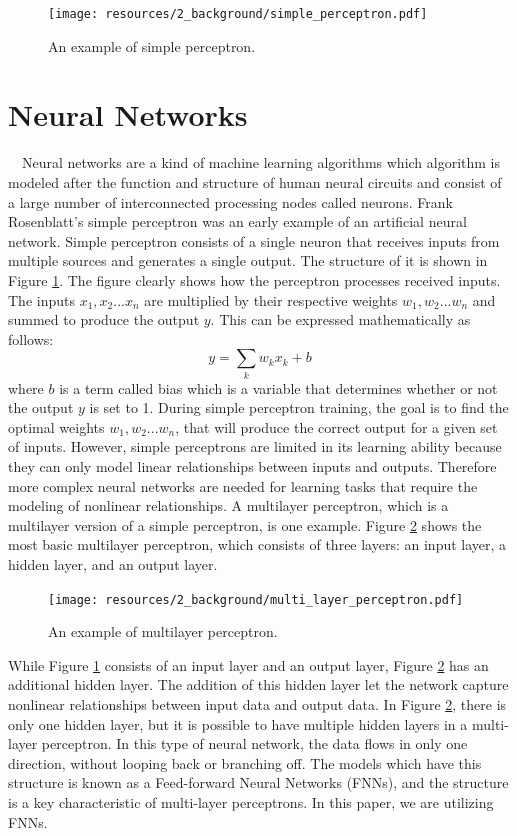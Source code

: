 \begin{figure}[h]
  \centering
  \texttt{[image: resources/2\_background/simple\_perceptron.pdf]}
  \caption{
    An example of simple perceptron.
  }
  \label{simple_perceptron}
\end{figure}

\section{Neural Networks}
　Neural networks are a kind of machine learning algorithms which 
algorithm is modeled after the function and structure of human 
neural circuits and consist of a large number of interconnected 
processing nodes called neurons.
Frank Rosenblatt's simple perceptron \cite{Rosenblatt1958ThePA} was 
an early example of an artificial neural network. 
Simple perceptron consists of a single neuron that receives inputs 
from multiple sources and generates a single output. 
The structure of it is shown in Figure \ref{simple_perceptron}. 
The figure clearly shows how the perceptron processes received inputs.
The inputs $x_1, x_2 ... x_n$ are multiplied by their respective weights
$w_1, w_2 ... w_n$ and summed to produce the output $y$.
This can be expressed mathematically as follows:
\begin{equation}
  \label{perceptron_output}
  y = \sum_{k}w_k x_k + b
\end{equation}
where $b$ is a term called bias which is a variable that determines 
whether or not the output $y$ is set to 1.
During simple perceptron training, the goal is to find the optimal 
weights $w_1, w_2 ... w_n$, that will produce the correct output for 
a given set of inputs.
However, simple perceptrons are limited in its learning ability because 
they can only model linear relationships between inputs and outputs.
Therefore more complex neural networks are needed for learning tasks 
that require the modeling of nonlinear relationships.
A multilayer perceptron, which is a multilayer version of a simple 
perceptron, is one example. Figure \ref{multilayer_perceptron} shows
the most basic multilayer perceptron, which consists of three layers: 
an input layer, a hidden layer, and an output layer.

\begin{figure}[h]
  \centering
  \texttt{[image: resources/2\_background/multi\_layer\_perceptron.pdf]}
  \caption{
    An example of multilayer perceptron.
  }
  \label{multilayer_perceptron}
\end{figure}
While Figure \ref{simple_perceptron} consists of an input layer and an 
output layer, Figure \ref{multilayer_perceptron} has an additional hidden 
layer. The addition of this hidden layer let the network capture nonlinear
relationships between input data and output data.
In Figure \ref{multilayer_perceptron}, there is only one hidden layer,
but it is possible to have multiple hidden layers in a multi-layer perceptron.
In this type of neural network, the data flows in only one direction, without 
looping back or branching off. The models which have this structure is known
as a Feed-forward Neural Networks (FNNs), 
and the structure is a key characteristic of multi-layer perceptrons.
In this paper, we are utilizing FNNs.

